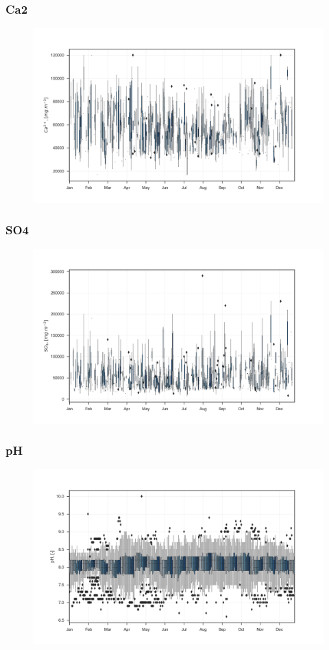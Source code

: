 \documentclass{beamer}
\begin{document}
\begin{frame}
\frametitle{Ca2}
\begin{figure}
\includegraphics[width=\textwidth]{rivers/all/1yr_boxpl/Ca2.png}
\end{figure}
\end{frame}

\begin{frame}
\frametitle{SO4}
\begin{figure}
\includegraphics[width=\textwidth]{rivers/all/1yr_boxpl/SO4.png}
\end{figure}
\end{frame}

\begin{frame}
\frametitle{pH}
\begin{figure}
\includegraphics[width=\textwidth]{rivers/all/1yr_boxpl/pH.png}
\end{figure}
\end{frame}
\end{document}
